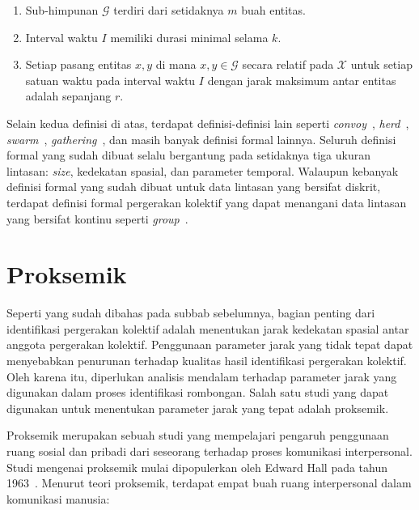 \begin{itemize}
    \begin{enumerate}
        \item Sub-himpunan $\mathcal{G}$ terdiri dari setidaknya $m$ buah entitas.
        \item Interval waktu $I$ memiliki durasi minimal selama $k$.
        \item Setiap pasang entitas $x, y$ di mana $x, y \in \mathcal{G}$ secara relatif pada $\mathcal{X}$ untuk setiap satuan waktu pada interval waktu $I$ dengan jarak maksimum antar entitas adalah sepanjang $r$.
    \end{enumerate}
\end{itemize}


Selain kedua definisi di atas, terdapat definisi-definisi lain seperti \textit{convoy}~\cite{jeung:convoys}, \textit{herd}~\cite{huang:02:herd}, \textit{swarm}~\cite{li:swarm}, \textit{gathering}~\cite{zheng:02:gatherings}, dan masih banyak definisi formal lainnya. Seluruh definisi formal yang sudah dibuat selalu bergantung pada setidaknya tiga ukuran lintasan: \textit{size}, kedekatan spasial, dan parameter temporal. Walaupun kebanyak definisi formal yang sudah dibuat untuk data lintasan yang bersifat diskrit, terdapat definisi formal pergerakan kolektif yang dapat menangani data lintasan yang bersifat kontinu seperti \textit{group}~\cite{buchin:group}.

\section{Proksemik}
\label{sec:proxemic}

Seperti yang sudah dibahas pada subbab sebelumnya, bagian penting dari identifikasi pergerakan kolektif adalah menentukan jarak kedekatan spasial antar anggota pergerakan kolektif. Penggunaan parameter jarak yang tidak tepat dapat menyebabkan penurunan terhadap kualitas hasil identifikasi pergerakan kolektif. Oleh karena itu, diperlukan analisis mendalam terhadap parameter jarak yang digunakan dalam proses identifikasi rombongan. Salah satu studi yang dapat digunakan untuk menentukan parameter jarak yang tepat adalah proksemik.

Proksemik merupakan sebuah studi yang mempelajari pengaruh penggunaan ruang sosial dan pribadi dari seseorang terhadap proses komunikasi interpersonal. Studi mengenai proksemik mulai dipopulerkan oleh Edward Hall pada tahun 1963~\cite{hall:06:proxemic}. Menurut teori proksemik, terdapat empat buah ruang interpersonal dalam komunikasi manusia:

